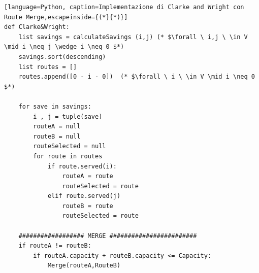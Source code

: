 \documentclass[]{article}
\begin{document}
\begin{lstlisting}[language=Python, caption=Implementazione di Clarke and Wright con Route Merge,escapeinside={(*}{*)}]
def Clarke&Wright:
	list savings = calculateSavings (i,j) (* $\forall \ i,j \ \in V \mid i \neq j \wedge i \neq 0 $*) 
	savings.sort(descending)
	list routes = []
	routes.append([0 - i - 0])  (* $\forall \ i \ \in V \mid i \neq 0 $*) 
	
	for save in savings:
		i , j = tuple(save)
		routeA = null
		routeB = null
		routeSelected = null
		for route in routes
			if route.served(i):
				routeA = route
				routeSelected = route
			elif route.served(j)
				routeB = route
				routeSelected = route
					    
	################## MERGE ########################	    
	if routeA != routeB:
		if routeA.capacity + routeB.capacity <= Capacity:
			Merge(routeA,RouteB)
	
			
		



\end{lstlisting}





\end{document}
